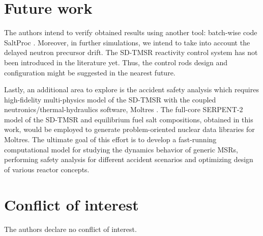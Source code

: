 \section{Future work}
The authors intend to verify obtained results using another tool: batch-wise 
code SaltProc \cite{rykhlevskii_arfc/saltproc_2018,rykhlevskii_milestone_2019}.
Moreover, in further simulations, we intend to take into account the delayed 
neutron precursor drift. The \gls{SD-TMSR} reactivity control system has not 
been introduced in the literature yet. Thus, the control rods design and 
configuration might be suggested in the nearest future.

Lastly, an additional area to explore is the accident safety analysis which 
requires high-fidelity multi-physics model of the \gls{SD-TMSR} with the 
coupled neutronics/thermal-hydraulics software, Moltres 
\cite{lindsay_introduction_2018}. The full-core SERPENT-2 model of the 
\gls{SD-TMSR} and equilibrium fuel salt compositions, obtained in this work, 
would be employed to generate problem-oriented nuclear data libraries for 
Moltres. The ultimate goal of this effort is to develop a 
fast-running computational model for studying the dynamics behavior of generic 
\glspl{MSR}, performing safety analysis for different accident scenarios and 
optimizing design of various reactor concepts.

\section{Conflict of interest}

The authors declare no conflict of interest. 
